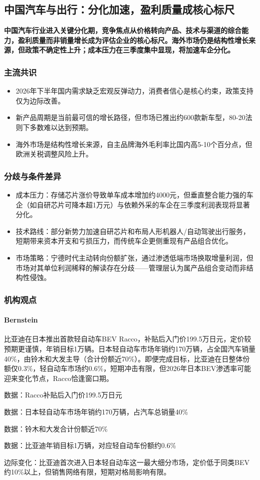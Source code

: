 \documentclass[11pt]{ctexart}
\begin{document}
\subsection{中国汽车与出行：分化加速，盈利质量成核心标尺}
\textbf{中国汽车行业进入关键分化期，竞争焦点从价格转向产品、技术与渠道的综合能力，盈利质量而非销量增长成为评估企业的核心标尺。海外市场仍是结构性增长来源，但政策不确定性上升；成本压力在三季度集中显现，将加速车企分化。}
\subsubsection*{主流共识}
\begin{itemize}
  \item 2026年下半年国内需求缺乏宏观反弹动力，消费者信心是核心约束，政策支持仅为边际改善。
  \item 新产品周期是当前最可信的增长路径，但市场已推出约600款新车型，80-20法则下多数难以达到预期。
  \item 海外市场是结构性增长来源，自主品牌海外毛利率比国内高5-10个百分点，但欧洲关税调整风险上升。
\end{itemize}
\subsubsection*{分歧与条件差异}
\begin{itemize}
  \item 成本压力：存储芯片涨价导致单车成本增加约4000元，但垂直整合能力强的车企（如自研芯片可降本超1万元）与依赖外采的车企在三季度利润表现将显著分化。
  \item 技术路线：部分新势力加速自研芯片和布局人形机器人/自动驾驶出行服务，短期带来资本开支和亏损压力，而传统车企更侧重现有产品组合优化。
  \item 市场策略：宁德时代主动转向份额扩张，通过渗透低端市场换取增量利润，但市场对其单位利润稀释的解读存在分歧——管理层认为属产品组合变动而非结构性侵蚀。
\end{itemize}
\subsubsection*{机构观点}
\paragraph{Bernstein} 比亚迪在日本推出首款轻自动车BEV Racco，补贴后入门价199.5万日元，定价较预期更谨慎，年销目标1万辆。日本轻自动车市场年销约170万辆，占全国汽车销量40\%，由铃木和大发主导（合计份额近70\%）。即便完成目标，比亚迪在日整体份额仅0.3\%，轻自动车市场约0.6\%，短期冲击有限，但2026年日本BEV渗透率可能迎来变化节点，Racco恰逢窗口期。
{\small\color{refgray}数据：Racco补贴后入门价199.5万日元\par}
{\small\color{refgray}数据：日本轻自动车市场年销约170万辆，占汽车总销量40\%\par}
{\small\color{refgray}数据：铃木和大发合计份额近70\%\par}
{\small\color{refgray}数据：比亚迪年销目标1万辆，对应轻自动车份额约0.6\%\par}
{\small\color{refgray}边际变化：比亚迪首次进入日本轻自动车这一最大细分市场，定价低于同类BEV约10\%以上，但销售网络有限，短期对格局影响有限。\par}
\end{document}
